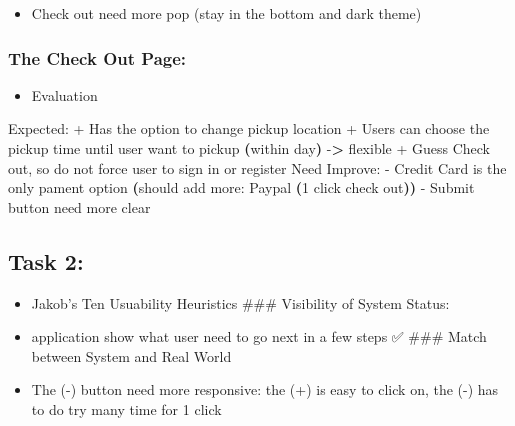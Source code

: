 \documentclass[
]{article}
\newenvironment{Shaded}{\begin{snugshade}}{\end{snugshade}}
\newcommand{\ErrorTok}[1]{\textcolor[rgb]{0.64,0.00,0.00}{\textbf{#1}}}
\newcommand{\ExtensionTok}[1]{#1}
\newcommand{\KeywordTok}[1]{\textcolor[rgb]{0.13,0.29,0.53}{\textbf{#1}}}
\newcommand{\NormalTok}[1]{#1}
\newcommand{\OperatorTok}[1]{\textcolor[rgb]{0.81,0.36,0.00}{\textbf{#1}}}
\providecommand{\tightlist}{%
  \setlength{\itemsep}{0pt}\setlength{\parskip}{0pt}}
\begin{document}
\begin{itemize}
\tightlist
\item
  Check out need more pop (stay in the bottom and dark theme)
\end{itemize}

\hypertarget{the-check-out-page}{%
\subsubsection{The Check Out Page:}\label{the-check-out-page}}

\begin{itemize}
\tightlist
\item
  Evaluation
\end{itemize}

\begin{Shaded}
\begin{Highlighting}[]
\ExtensionTok{Expected:}
\ExtensionTok{+}\NormalTok{ Has the option to change pickup location}
\ExtensionTok{+}\NormalTok{ Users can choose the pickup time until user want to pickup }\ErrorTok{(}\ExtensionTok{within}\NormalTok{ day}\KeywordTok{)} \ExtensionTok{{-}}\OperatorTok{\textgreater{}}\NormalTok{ flexible}
\ExtensionTok{+}\NormalTok{ Guess Check out, so do not force user to sign in or register}
\ExtensionTok{Need}\NormalTok{ Improve:}
\ExtensionTok{{-}}\NormalTok{ Credit Card is the only pament option }\ErrorTok{(}\ExtensionTok{should}\NormalTok{ add more: Paypal }\ErrorTok{(}\ExtensionTok{1}\NormalTok{ click check out}\KeywordTok{))}
\ExtensionTok{{-}}\NormalTok{ Submit button need more clear}
\end{Highlighting}
\end{Shaded}

\hypertarget{task-2}{%
\subsection{Task 2:}\label{task-2}}

\begin{itemize}
\tightlist
\item
  Jakob's Ten Usuability Heuristics \#\#\# Visibility of System Status:
\item
  application show what user need to go next in a few steps ✅ \#\#\#
  Match between System and Real World
\item
  The (-) button need more responsive: the (+) is easy to click on, the
  (-) has to do try many time for 1 click
\end{itemize}
\end{document}
